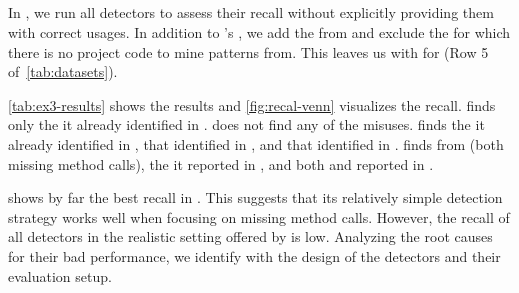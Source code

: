 %
%



\subsection{}

In , we run all detectors to assess their recall without explicitly providing them with correct usages.
In addition to \MUBench's , we add the  from  and exclude the  for which there is no project code to mine patterns from.
This leaves us with  for  (Row 5 of~\autoref{tab:datasets}).

\autoref{tab:ex3-results} shows the results and \autoref{fig:recal-venn} visualizes the recall.
%
\Jadet finds only the  it already identified in .
%
\GROUMiner does not find any of the misuses.
%
\Tikanga finds the  it already identified in ,  that \DMMC identified in , and  that \Jadet identified in .
%
\DMMC finds  from \MUBench (both missing method calls), the  it reported in , and  both \Jadet and \Tikanga reported in .

\DMMC shows by far the best recall in .
This suggests that its relatively simple detection strategy works well when focusing on missing method calls.
However, the recall of all detectors in the realistic setting offered by  is low.
Analyzing the root causes for their bad performance, we identify  with the design of the detectors and their evaluation setup.

